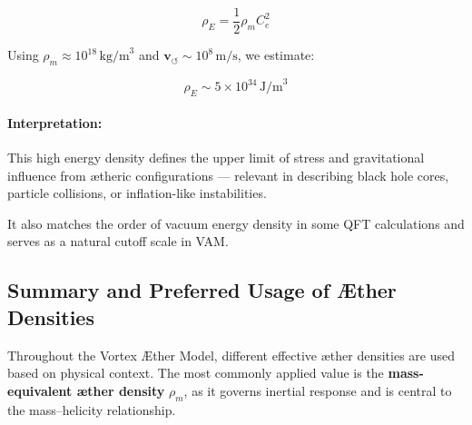 \documentclass[preprint]{revtex4-2}
\begin{document}
                \[
                \rho_{\scriptscriptstyle\boldsymbol\!E} = \frac{1}{2} \rho_{\scriptscriptstyle\boldsymbol\!m} C_e^2
                \]
        
                Using \( \rho_{\scriptscriptstyle\boldsymbol\!m} \approx 10^{18} \, \text{kg/m}^3 \) and \( \mathbf{v}_{\scriptscriptstyle\boldsymbol{\circlearrowleft}} \sim 10^8 \, \text{m/s} \), we estimate:
        
                \[
                \rho_{\scriptscriptstyle\boldsymbol\!E} \sim 5 \times 10^{34} \, \text{J/m}^3
                \]
        
                \paragraph{Interpretation:}
                This high energy density defines the upper limit of stress and gravitational influence from ætheric configurations — relevant in describing black hole cores, particle collisions, or inflation-like instabilities.
        
                It also matches the order of vacuum energy density in some QFT calculations and serves as a natural cutoff scale in VAM.
        
                \subsection*{Summary and Preferred Usage of Æther Densities}
        
                Throughout the Vortex \AE{}ther Model, different effective æther densities are used based on physical context. The most commonly applied value is the \textbf{mass-equivalent æther density} \( \rho_{\scriptscriptstyle\boldsymbol\!m} \), as it governs inertial response and is central to the mass–helicity relationship.
        
\end{document}
